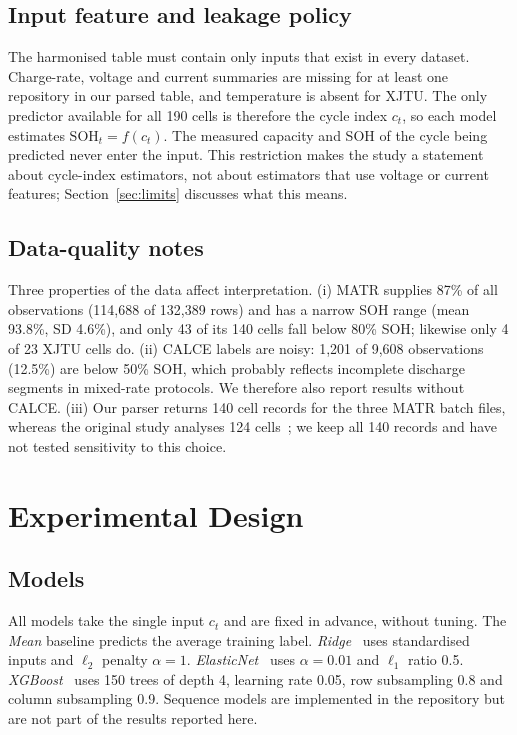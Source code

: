 \documentclass[journal]{IEEEtran}
\begin{document}
\subsection{Input feature and leakage policy}
The harmonised table must contain only inputs that exist in every dataset. Charge-rate, voltage and current summaries are missing for at least one repository in our parsed table, and temperature is absent for XJTU. The only predictor available for all 190 cells is therefore the cycle index $c_t$, so each model estimates $\mathrm{SOH}_t=f(c_t)$. The measured capacity and SOH of the cycle being predicted never enter the input. This restriction makes the study a statement about cycle-index estimators, not about estimators that use voltage or current features; Section~\ref{sec:limits} discusses what this means.

\subsection{Data-quality notes}
Three properties of the data affect interpretation. (i) MATR supplies 87\% of all observations (114,688 of 132,389 rows) and has a narrow SOH range (mean 93.8\%, SD 4.6\%), and only 43 of its 140 cells fall below 80\% SOH; likewise only 4 of 23 XJTU cells do. (ii) CALCE labels are noisy: 1,201 of 9,608 observations (12.5\%) are below 50\% SOH, which probably reflects incomplete discharge segments in mixed-rate protocols. We therefore also report results without CALCE. (iii) Our parser returns 140 cell records for the three MATR batch files, whereas the original study analyses 124 cells~\cite{severson2019}; we keep all 140 records and have not tested sensitivity to this choice.

\section{Experimental Design}
\subsection{Models}
All models take the single input $c_t$ and are fixed in advance, without tuning. The \emph{Mean} baseline predicts the average training label. \emph{Ridge}~\cite{hoerl1970ridge} uses standardised inputs and $\ell_2$ penalty $\alpha=1$. \emph{ElasticNet}~\cite{zou2005elasticnet} uses $\alpha=0.01$ and $\ell_1$ ratio 0.5. \emph{XGBoost}~\cite{chen2016xgboost} uses 150 trees of depth 4, learning rate 0.05, row subsampling 0.8 and column subsampling 0.9. Sequence models are implemented in the repository but are not part of the results reported here.
\end{document}
